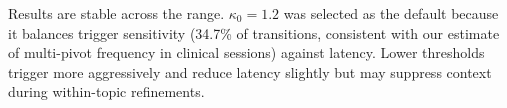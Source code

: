 \documentclass[11pt]{article}
\begin{document}
Results are stable across the range. $\kappa_0{=}1.2$ was selected as the
default because it balances trigger sensitivity (34.7\% of transitions, consistent
with our estimate of multi-pivot frequency in clinical sessions) against latency.
Lower thresholds trigger more aggressively and reduce latency slightly but may
suppress context during within-topic refinements.



\end{document}
